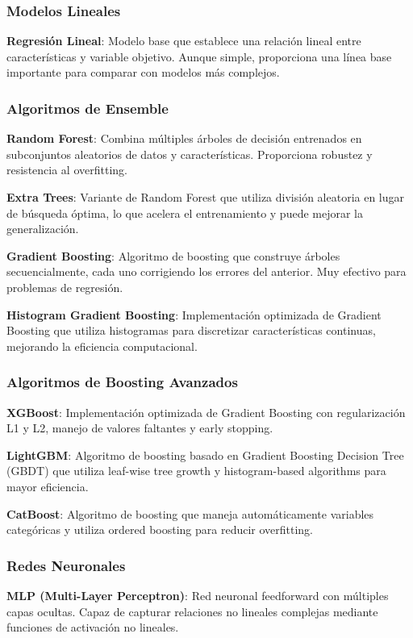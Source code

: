 \documentclass[conference]{IEEEtran}
\begin{document}
	\subsubsection{Modelos Lineales}
	\textbf{Regresión Lineal}: Modelo base que establece una relación lineal entre características y variable objetivo. Aunque simple, proporciona una línea base importante para comparar con modelos más complejos.
	
	\subsubsection{Algoritmos de Ensemble}
	\textbf{Random Forest}: Combina múltiples árboles de decisión entrenados en subconjuntos aleatorios de datos y características. Proporciona robustez y resistencia al overfitting.
	
	\textbf{Extra Trees}: Variante de Random Forest que utiliza división aleatoria en lugar de búsqueda óptima, lo que acelera el entrenamiento y puede mejorar la generalización.
	
	\textbf{Gradient Boosting}: Algoritmo de boosting que construye árboles secuencialmente, cada uno corrigiendo los errores del anterior. Muy efectivo para problemas de regresión.
	
	\textbf{Histogram Gradient Boosting}: Implementación optimizada de Gradient Boosting que utiliza histogramas para discretizar características continuas, mejorando la eficiencia computacional.
	
	\subsubsection{Algoritmos de Boosting Avanzados}
	\textbf{XGBoost}: Implementación optimizada de Gradient Boosting con regularización L1 y L2, manejo de valores faltantes y early stopping.
	
	\textbf{LightGBM}: Algoritmo de boosting basado en Gradient Boosting Decision Tree (GBDT) que utiliza leaf-wise tree growth y histogram-based algorithms para mayor eficiencia.
	
	\textbf{CatBoost}: Algoritmo de boosting que maneja automáticamente variables categóricas y utiliza ordered boosting para reducir overfitting.
	
	\subsubsection{Redes Neuronales}
	\textbf{MLP (Multi-Layer Perceptron)}: Red neuronal feedforward con múltiples capas ocultas. Capaz de capturar relaciones no lineales complejas mediante funciones de activación no lineales.
	
\end{document}
